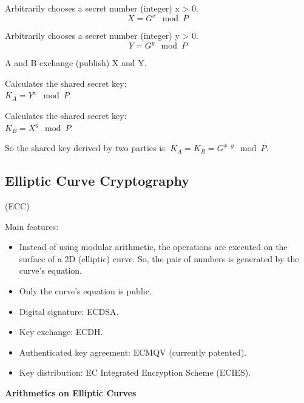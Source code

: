 \begin{multicols}{2}
    \centering
    Arbitrarily chooses a secret number (integer) x > 0.
    \[
        X= G^x \mod P
    \]
    \columnseprule=1pt
    \columnbreak
    
    Arbitrarily chooses a secret number (integer) y > 0.
    \[
        Y= G^y \mod P
    \]
\end{multicols}

\begin{center}
    A and B exchange (publish) X and Y.
\end{center}

\begin{multicols}{2}
    \centering
    Calculates the shared secret key: \\ $K_A = Y^x \mod P$.
    
    \columnseprule=1pt
    \columnbreak

    Calculates the shared secret key: \\ $K_B = X^y \mod P$.
\end{multicols}

\vspace{1 cm}

So the shared key derived by two parties is: $K_A = K_B=G^{x\cdot y}\mod P$.

\subsection{Elliptic Curve Cryptography}
\begin{center}
    (ECC)
\end{center}
Main features:
\begin{itemize}
    \item Instead of using modular arithmetic, the operations are executed on the surface of a 2D (elliptic) curve. So, the pair of numbers is generated by the curve's equation. 
    \item Only the curve's equation is public.
    \item Digital signature: ECDSA.
    \item Key exchange: ECDH.
    \item Authenticated key agreement: ECMQV (currently patented).
    \item Key distribution: EC Integrated Encryption Scheme (ECIES).
\end{itemize}

\begin{center}
    \textbf{Arithmetics on Elliptic Curves}
\end{center}


